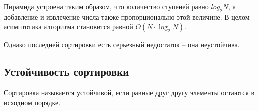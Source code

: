 Пирамида устроена таким образом, что количество ступеней равно $log_2{N}$, а добавление и извлечение числа также пропорционально этой величине. В целом асимптотика алгоритма становится равной $O(N\cdot\log_2{N})$.  

Однако последней сортировки есть серьезный недостаток -- она неустойчива. 

\subsection*{Устойчивость сортировки}

Сортировка называется устойчивой, если равные друг другу элементы остаются в исходном порядке. 
